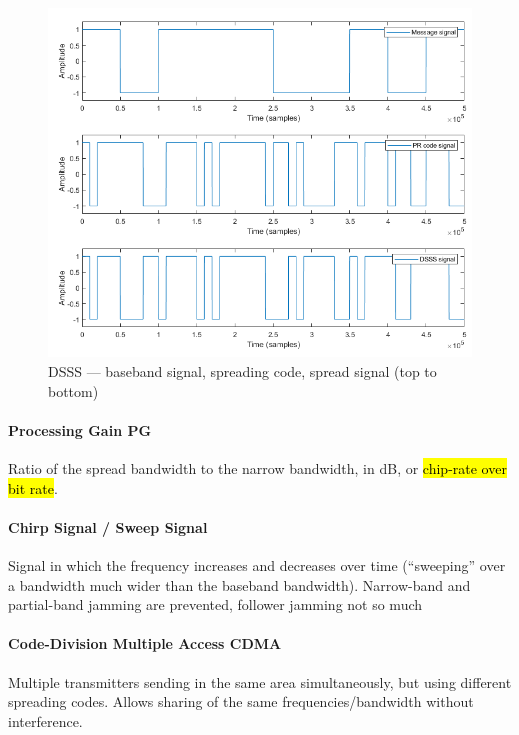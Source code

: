 \begin{figure}[h]
	\centering
	\includegraphics[scale=0.6]{images/2-dsss.png}
	\caption{DSSS --- baseband signal, spreading code, spread signal (top to bottom)}%
	\label{fig:dsss}
\end{figure}

\paragraph{Processing Gain PG}
Ratio of the spread bandwidth to the narrow bandwidth, in dB, or \hl{chip-rate over bit rate}.


\paragraph{Chirp Signal / Sweep Signal}
Signal in which the frequency increases and decreases over time (``sweeping'' over a bandwidth much wider than the baseband bandwidth).
Narrow-band and partial-band jamming are prevented, follower jamming not so much

\paragraph{Code-Division Multiple Access CDMA}
Multiple transmitters sending in the same area simultaneously, but using different spreading codes.
Allows sharing of the same frequencies/bandwidth without interference.
